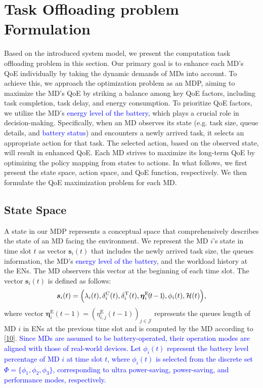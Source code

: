 \documentclass[10pt, journal,letterpaper]{IEEEtran}
\begin{document}
\section{Task Offloading problem Formulation}
\label{section:IV}

Based on the introduced system model, we present the computation task offloading problem in this section. Our primary goal is to enhance each MD's QoE individually by taking the dynamic demands of MDs into account. To achieve this, we approach the optimization problem as an MDP, aiming to maximize the MD's QoE by striking a balance among key QoE factors, including task completion, task delay, and energy consumption. To prioritize QoE factors, we utilize the MD's \textcolor{blue}{energy level of the battery}, which plays a crucial role in decision-making. Specifically, when an MD observes its state (e.g. task size, queue details, and \textcolor{blue}{battery status}) and encounters a newly arrived task, it selects an appropriate action for that task. The selected action, based on the observed state, will result in enhanced QoE. Each MD strives to maximize its long-term QoE by optimizing the policy mapping from states to actions. In what follows, we first present the state space, action space, and QoE function, respectively. We then formulate the QoE maximization problem for each MD.




\subsection{State Space}
A state in our MDP represents a conceptual space that comprehensively describes the state of an MD facing the environment. We represent the MD $i$'s state in time slot $t$ as vector $\boldsymbol{s}_i(t)$ that includes the newly arrived task size, the queues information, the MD's \textcolor{blue}{energy level of the battery}, and the workload history at the ENs. The MD observers this vector at the beginning of each time slot. The vector $\boldsymbol{s}_i(t)$ is defined as follows:
\begin{alignat}{1}
\boldsymbol{s}_i(t) = \Big(\lambda_i(t), \delta_i^{\text{C}}(t), \delta_i^{\text{T}}(t), \boldsymbol{\eta}_i^{\text{E}}\hspace{-0.4mm}(\hspace{-0.4mm}t\hspace{-0.4mm}-\hspace{-0.4mm}1\hspace{-0.5mm}),\phi_i(t), \mathcal{H}(t) \Big),
	\label{18}
\end{alignat}
where vector $\boldsymbol{\eta}_i^{\text{E}}(t-1) = (\eta_{i,j}^{\text{E}}(t-1))_{j \in \mathcal{J}}$ represents the queues length of MD $i$ in ENs at the previous time slot and is computed by the MD according to \eqref{10}. 
\textcolor{blue}{Since MDs are assumed to be battery-operated, their operation modes are aligned with those of real-world devices. Let $\phi_i(t)$ represent the \textcolor{blue}{battery level percentage of MD $i$} at time slot $t$, where $\phi_i(t)$ is selected from the discrete set $\Phi = \{\phi_1, \phi_2, \phi_3\}$, corresponding to ultra power-saving, power-saving, and performance modes, respectively.}
\end{document}
